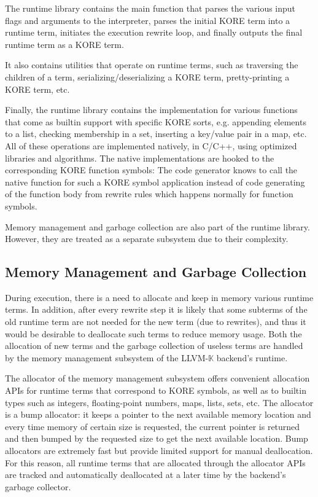 \documentclass{article}
\theoremstyle{definition}
\newcommand{\K}{$\mathbb{K}$\xspace}
\newcommand{\KL}{LLVM-\K}
\begin{document}
The runtime library contains the main function that parses the various input flags and arguments to the interpreter, parses the initial KORE term into a runtime term, initiates the execution rewrite loop, and finally outputs the final runtime term as a KORE term.

It also contains utilities that operate on runtime terms, such as traversing the children of a term, serializing/deserializing a KORE term, pretty-printing a KORE term, etc.

Finally, the runtime library contains the implementation for various functions that come as builtin support with specific KORE sorts, e.g. appending elements to a list, checking membership in a set, inserting a key/value pair in a map, etc. All of these operations are implemented natively, in C/C++, using optimized libraries and algorithms. The native implementations are hooked to the corresponding KORE function symbols: The code generator knows to call the native function for such a KORE symbol application instead of code generating of the function body from rewrite rules which happens normally for function symbols.

Memory management and garbage collection are also part of the runtime library. However, they are treated as a separate subsystem due to their complexity.


\subsection{Memory Management and Garbage Collection}
During execution, there is a need to allocate and keep in memory various runtime terms. In addition, after every rewrite step it is likely that some subterms of the old runtime term are not needed for the new term (due to rewrites), and thus it would be desirable to deallocate such terms to reduce memory usage. Both the allocation of new terms and the garbage collection of useless terms are handled by the memory management subsystem of the \KL backend’s runtime.

The allocator of the memory management subsystem offers convenient allocation APIs for runtime terms that correspond to KORE symbols, as well as to builtin types such as integers, floating-point numbers, maps, lists, sets, etc. The allocator is a bump allocator: it keeps a pointer to the next available memory location and every time memory of certain size is requested, the current pointer is returned and then bumped by the requested size to get the next available location. Bump allocators are extremely fast but provide limited support for manual deallocation. For this reason, all runtime terms that are allocated through the allocator APIs are tracked and automatically deallocated at a later time by the backend's garbage collector.
\end{document}
